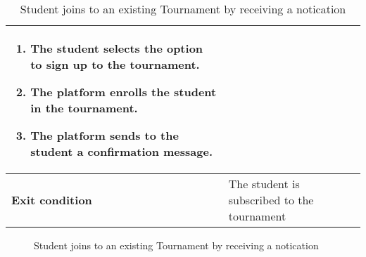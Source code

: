 \begin{enumerate}[label=\textbf{UC\arabic*}:,ref=UC\arabic*,leftmargin=1.3cm]
{\begin{table}[H]
\begin{tabular}{|l|p{11.9cm}|}
\begin{enumerate}[label=\arabic*.]
                              \item The student selects the option to sign up to the tournament.
                              \item The platform enrolls the student in the tournament.
                              \item The platform sends to the student a confirmation message.
                        \end{enumerate} \\\hline
                        \textbf{Exit condition}  & The student is subscribed to the tournament                                                \\\hline
                  \end{tabular}
                  \caption{Student joins to an existing Tournament by receiving a notication}
                  \label{table:Student joins to an existing Tournament by receiving a notication}
            \end{table}
            \begin{figure}[H]
                  \centering
                  \caption{Student joins to an existing Tournament by receiving a notication}
                  \label{fig:Student joins to an existing Tournament by receiving a notication}
            \end{figure}
            \pagebreak
      }
\end{enumerate}

